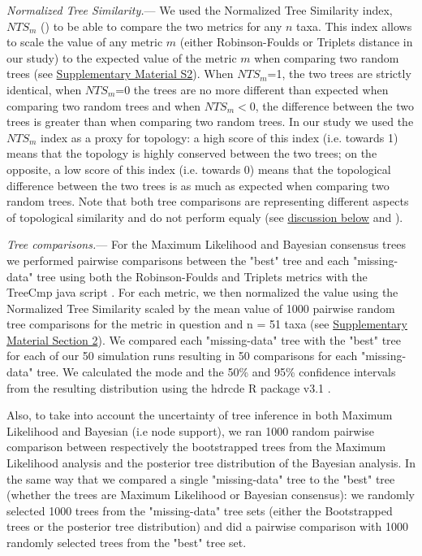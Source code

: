 \documentclass[12pt,letterpaper]{article}
\renewcommand{\subsubsection}[1]{%
\vspace{2ex}
\noindent
\textit{#1.}---}
\begin{document}
\subsubsection{Normalized Tree Similarity}
We used the Normalized Tree Similarity index, $NTS_m$ (\citealp{Bogdanowicz2012}) to be able to compare the two metrics for any $n$ taxa. This index allows to scale the value of any metric $m$ (either Robinson-Foulds or Triplets distance in our study) to the expected value of the metric $m$ when comparing two random trees (see \hyperref[SupplementaryMaterial]{Supplementary Material S2}). When $NTS_m$=1, the two trees are strictly identical, when $NTS_m$=0 the trees are no more different than expected when comparing two random trees and when $NTS_m$$<$0, the difference between the two trees is greater than when comparing two random trees. In our study we used the $NTS_m$ index as a proxy for topology: a high score of this index (i.e. towards 1) means that the topology is highly conserved between the two trees; on the opposite, a low score of this index (i.e. towards 0) means that the topological difference between the two trees is as much as expected when comparing two random trees. Note that both tree comparisons are representing different aspects of topological similarity and do not perform equaly (see \hyperref[metrics_discussion]{discussion below} and \citealt{kuhnerpractical2014}).

\subsubsection{Tree comparisons}
\label{tree_comparisons}
For the Maximum Likelihood and Bayesian consensus trees we performed pairwise comparisons between the "best" tree and each "missing-data" tree using both the Robinson-Foulds and Triplets metrics with the TreeCmp java script \citep{Bogdanowicz2012}. For each metric, we then normalized the value using the Normalized Tree Similarity scaled by the mean value of 1000 pairwise random tree comparisons for the metric in question and n = 51 taxa (see \hyperref[SupplementaryMaterial]{Supplementary Material Section 2}). %
We compared each "missing-data" tree with the "best" tree for each of our 50 simulation runs resulting in 50 comparisons for each "missing-data" tree. We calculated the mode and the 50\% and 95\% confidence intervals from the resulting distribution using the hdrcde R package v3.1 \citep{hdrcde}.

Also, to take into account the uncertainty of tree inference in both Maximum Likelihood and Bayesian (i.e node support), we ran 1000 random pairwise comparison between respectively the bootstrapped trees from the Maximum Likelihood analysis and the posterior tree distribution of the Bayesian analysis. In the same way that we compared a single "missing-data" tree to the "best" tree (whether the trees are Maximum Likelihood or Bayesian consensus): we randomly selected 1000 trees from the "missing-data" tree sets (either the Bootstrapped trees or the posterior tree distribution) and did a pairwise comparison with 1000 randomly selected trees from the "best" tree set.
\end{document}
